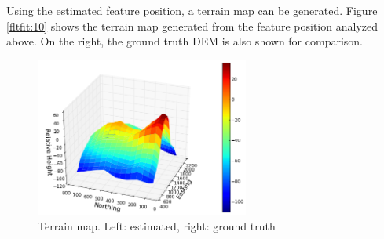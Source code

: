 Using the estimated feature position, a terrain map can be generated.
Figure \ref{fltfit:10} shows the terrain map generated from the
feature position analyzed above. On the right, the ground truth DEM is
also shown for comparison. 

\begin{figure}[h]
\centering
\includegraphics[width=7cm, keepaspectratio=true]
{./Figures/fltfig/cut1/Figure90.png}
\caption{Terrain map. Left: estimated, right: ground truth }
\label{fltfig:10}
\end{figure}


